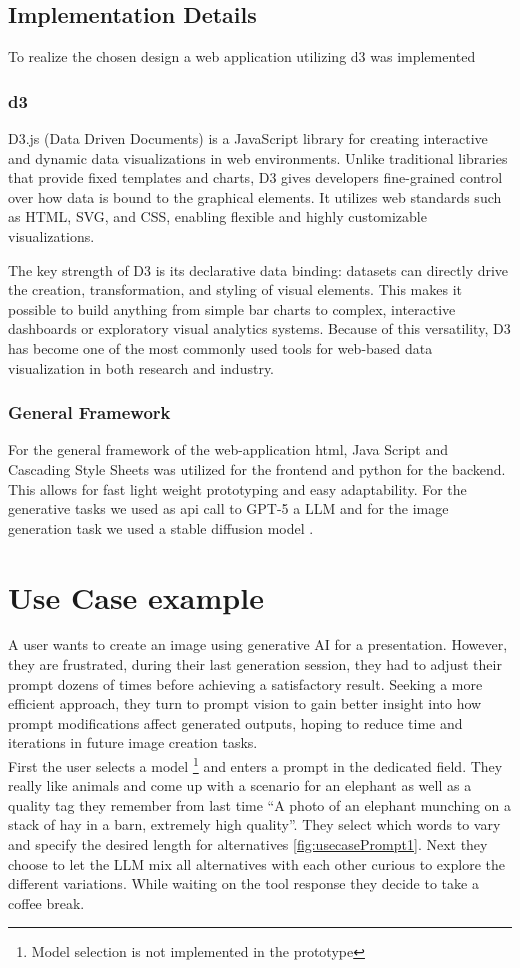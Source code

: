\documentclass[
  a4paper,  %
  twoside,  %
  bibliography=totoc,
  headsepline,
  cleardoublepage=empty,
  parskip=half,
  draft=false
]{scrbook}
\begin{document}
\section{Implementation Details}
To realize the chosen design a web application utilizing d3 was implemented
\subsection{d3}
D3.js (Data Driven Documents) is a JavaScript library for creating interactive and dynamic data visualizations in web environments. Unlike traditional libraries that provide fixed templates and charts, D3 gives developers fine-grained control over how data is bound to the graphical elements. It utilizes web standards such as HTML, SVG, and CSS, enabling flexible and highly customizable visualizations.

The key strength of D3 is its declarative data binding: datasets can directly drive the creation, transformation, and styling of visual elements. This makes it possible to build anything from simple bar charts to complex, interactive dashboards or exploratory visual analytics systems. Because of this versatility, D3 has become one of the most commonly used tools for web-based data visualization in both research and industry.

\subsection{General Framework}
For the general framework of the web-application html, Java Script and Cascading Style Sheets was utilized for the frontend and python for the backend.
This allows for fast light weight prototyping and easy adaptability. For the generative tasks we used as api call to GPT-5 a LLM and for the image generation task we used a stable diffusion model \cite{stableDiffusion}.
                                                                        

\chapter{Use Case example}
A user wants to create an image using generative AI for a presentation. However, they are frustrated, during their last generation session, they had to adjust their prompt dozens of times before achieving a satisfactory result. Seeking a more efficient approach, they turn to prompt vision to gain better insight into how prompt modifications affect generated outputs, hoping to reduce time and iterations in future image creation tasks.\\
First the user selects a model \footnote{Model selection is not implemented in the prototype} and enters a prompt in the dedicated field. They really like animals and come up with a scenario for an elephant as well as a quality tag they remember from last time \enquote{A photo of an elephant munching on a stack of hay in a barn, extremely high quality}. They select which words to vary and specify the desired length for alternatives \cref{fig:usecasePrompt1}. Next they choose to let the LLM mix all alternatives with each other curious to explore the different variations. While waiting on the tool response they decide to take a coffee break. 
\end{document}
